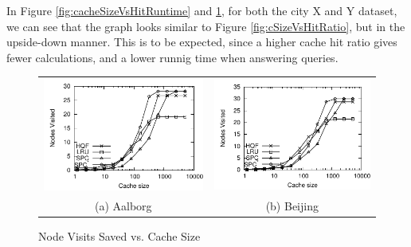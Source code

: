 In Figure \ref{fig:cacheSizeVsHitRuntime} and \ref{fig:cacheSizeVsNodesvisited}, for both the city X and Y dataset,  we can see that the graph looks similar to Figure \ref{fig:cSizeVsHitRatio}, but in the upside-down manner. This is to be expected, since a higher cache hit ratio gives fewer \spath calculations, and a lower runnig time when answering queries.

\begin{figure}[htb]
\center
  \begin{tabular}{@{}c@{ }c@{}}
     \includegraphics[width=0.5\columnwidth]{figures/cachesize_diffnodes_aal.pdf}
     &
     \includegraphics[width=0.5\columnwidth]{figures/cachesize_diffnodes_bei.pdf}
      \\
     (a) Aalborg & (b)  Beijing
     \end{tabular}
\caption{Node Visits Saved vs. Cache Size}
\label{fig:cacheSizeVsNodesvisited}
\end{figure}
